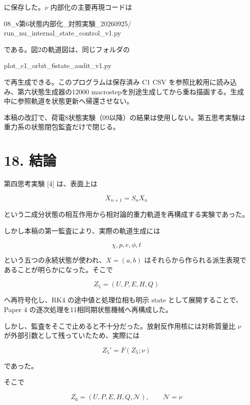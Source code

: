 \documentclass[
  a4paper,
]{ltjsarticle}
\newenvironment{Shaded}{}{}
\newcommand{\NormalTok}[1]{#1}
\begin{document}
に保存した。\(\nu\) 内部化の主要再現コードは

\begin{Shaded}
\begin{Highlighting}[]
\NormalTok{08\_ν第6状態内部化\_対照実験\_20260925/}
\NormalTok{run\_nu\_internal\_state\_control\_v1.py}
\end{Highlighting}
\end{Shaded}

である。図2の軌道図は、同じフォルダの

\begin{Shaded}
\begin{Highlighting}[]
\NormalTok{plot\_c1\_orbit\_6state\_audit\_v1.py}
\end{Highlighting}
\end{Shaded}

で再生成できる。このプログラムは保存済み C1 CSV
を参照比較用に読み込み、第六状態生成器の12000
macrostepを別途生成してから重ね描画する。生成中に参照軌道を状態更新へ帰還させない。

本稿の改訂で、荷電8状態実験（09以降）の結果は使用しない。第五思考実験は重力系の状態閉包監査だけで閉じる。

\section{18. 結論}\label{ux7d50ux8ad6}

第四思考実験 {[}4{]} は、表面上は

\[
X_{n+1}=S_nX_n
\]

という二成分状態の相互作用から相対論的重力軌道を再構成する実験であった。

しかし本稿の第一監査により、実際の軌道生成には

\[
\chi,p,e,\phi,t
\]

という五つの永続状態が使われ、\(X=(a,b)\)
はそれらから作られる派生表現であることが明らかになった。そこで

\[
Z_5=(U,P,E,H,Q)
\]

へ再符号化し、RK4 の途中値と処理位相も明示 state
として展開することで、Paper 4 の逐次処理を11相同期状態機械へ再構成した。

しかし、監査をそこで止めると不十分だった。放射反作用核には対称質量比
\(\nu\) が外部引数として残っていたため、実際には

\[
Z_5'=F(Z_5;\nu)
\]

であった。

そこで

\[
\boxed{
Z_6=(U,P,E,H,Q,\mathcal N),
\qquad
\mathcal N=\nu
}
\]
\end{document}
